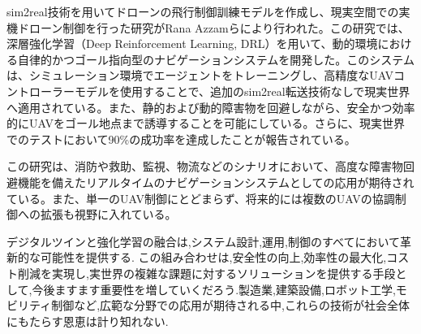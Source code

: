 sim2real技術を用いてドローンの飛行制御訓練モデルを作成し、現実空間での実機ドローン制御を行った研究がRana Azzamらにより行われた。この研究では、深層強化学習（Deep Reinforcement Learning, DRL）を用いて、動的環境における自律的かつゴール指向型のナビゲーションシステムを開発した。このシステムは、シミュレーション環境でエージェントをトレーニングし、高精度なUAVコントローラーモデルを使用することで、追加のsim2real転送技術なしで現実世界へ適用されている。また、静的および動的障害物を回避しながら、安全かつ効率的にUAVをゴール地点まで誘導することを可能にしている。さらに、現実世界でのテストにおいて90\%の成功率を達成したことが報告されている\cite{azzam2023uav}。

この研究は、消防や救助、監視、物流などのシナリオにおいて、高度な障害物回避機能を備えたリアルタイムのナビゲーションシステムとしての応用が期待されている。また、単一のUAV制御にとどまらず、将来的には複数のUAVの協調制御への拡張も視野に入れている\cite{azzam2023uav}。



デジタルツインと強化学習の融合は,システム設計,運用,制御のすべてにおいて革新的な可能性を提供する.
この組み合わせは,安全性の向上,効率性の最大化,コスト削減を実現し,実世界の複雑な課題に対するソリューションを提供する手段として,今後ますます重要性を増していくだろう.製造業,建築設備,ロボット工学,モビリティ制御など,広範な分野での応用が期待される中,これらの技術が社会全体にもたらす恩恵は計り知れない.


